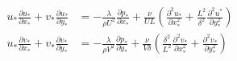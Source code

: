 \documentclass[french]{article}
\begin{document}
\begin{align}
	u_{*}\frac{\partial u_{*}}{\partial x_{*}} + 
	v_{*}\frac{\partial u_{*}}{\partial y_{*}} 
	&= - \frac{\lambda}{\rho U^{2}}
	\frac{\partial p_{*}}{\partial  x_{*}} +
	\frac{\nu}{UL}\left (
	\frac{\partial^{2} u_{*}}{\partial  x_{*}^{2}} + 
	\frac{L^{2}}{\delta ^ {2}}
	\frac{\partial^{2} u^{*}}{\partial  y_{*}^{2}}\right ) \\
	u_{*}\frac{\partial v_{*}}{\partial x_{*}} + 
	v_{*}\frac{\partial v_{*}}{\partial y_{*}} 
	&= - \frac{\lambda}{\rho V^{2}}
	\frac{\partial p_{*}}{\partial  y_{*}} +
	\frac{\nu}{V\delta}\left (
	\frac{\delta^{2}}{L^{2}}
	\frac{\partial^{2} v_{*}}{\partial  x_{*}^{2}} + 
	\frac{\partial^{2} v_{*}}{\partial  y_{*}^{2}}\right ) 
\end{align}
\end{document}
